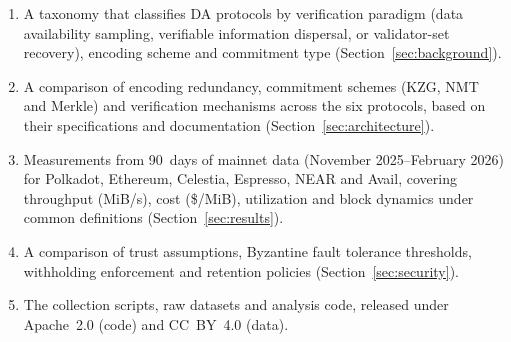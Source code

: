 \begin{enumerate}
    \item A taxonomy that classifies DA protocols by verification paradigm (data availability sampling, verifiable information dispersal, or validator-set recovery), encoding scheme and commitment type (Section~\ref{sec:background}).

    \item A comparison of encoding redundancy, commitment schemes (KZG, NMT and Merkle) and verification mechanisms across the six protocols, based on their specifications and documentation (Section~\ref{sec:architecture}).

    \item Measurements from 90~days of mainnet data (November 2025--February 2026) for Polkadot, Ethereum, Celestia, Espresso, NEAR and Avail, covering throughput (MiB/s), cost (\$/MiB), utilization and block dynamics under common definitions (Section~\ref{sec:results}).

    \item A comparison of trust assumptions, Byzantine fault tolerance thresholds, withholding enforcement and retention policies (Section~\ref{sec:security}).

    \item The collection scripts, raw datasets and analysis code, released under Apache~2.0 (code) and CC~BY~4.0 (data).
\end{enumerate}
